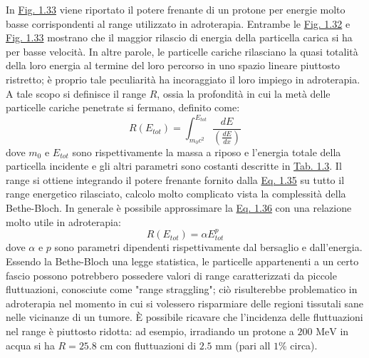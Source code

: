 \documentclass[12pt,a4paper,twoside]{report}
\begin{document}
	In \hyperref[fig:adroterapic_range]{Fig. 1.33} viene riportato il potere frenante di un protone per energie molto basse corrispondenti al range utilizzato in adroterapia. Entrambe le \hyperref[fig:bethe_bloch]{Fig. 1.32} e \hyperref[fig:adroterapic_range]{Fig. 1.33} mostrano che il maggior rilascio di energia della particella carica si ha per basse velocità. In altre parole, le particelle cariche rilasciano la quasi totalità della loro energia al termine del loro percorso in uno spazio lineare piuttosto ristretto; è proprio tale peculiarità ha incoraggiato il loro impiego in adroterapia. A tale scopo si definisce il range $R$, ossia la profondità in cui la metà delle particelle cariche penetrate si fermano, definito come:
	\begin{equation}
		R(E_{tot})=\int_{m_0c^2}^{E_{tot}}\frac{dE}{\left(\frac{dE}{dx}\right)}
		\label{eq:range}
	\end{equation}
	dove $m_0$ e $E_{tot}$ sono rispettivamente la massa a riposo e l'energia totale della particella incidente e gli altri parametri sono costanti descritte in \hyperref[tab:bethe_bloch]{Tab. 1.3}. Il range si ottiene integrando il potere frenante fornito dalla \hyperref[eq:bethe_bloch]{Eq. 1.35} su tutto il range energetico rilasciato, calcolo molto complicato vista la complessità della Bethe-Bloch. In generale è possibile approssimare la \hyperref[eq:range]{Eq. 1.36} con una relazione molto utile in adroterapia:
	\begin{equation}
		R(E_{tot})=\alpha E_{tot}^p
		\label{eq:range_approx}
	\end{equation}
	dove $\alpha$ e $p$ sono parametri dipendenti rispettivamente dal bersaglio e dall'energia. Essendo la Bethe-Bloch una legge statistica, le particelle appartenenti a un certo fascio possono potrebbero possedere valori di range caratterizzati da piccole fluttuazioni, conosciute come "range straggling"; ciò risulterebbe problematico in adroterapia nel momento in cui si volessero risparmiare delle regioni tissutali sane nelle vicinanze di un tumore. \`E possibile ricavare che l'incidenza delle fluttuazioni nel range è piuttosto ridotta: ad esempio, irradiando un protone a $200\mbox{ MeV}$ in acqua si ha $R=25.8\mbox{ cm}$ con fluttuazioni di $2.5\mbox{ mm}$ (pari all $1\%$ circa).
	
\end{document}
